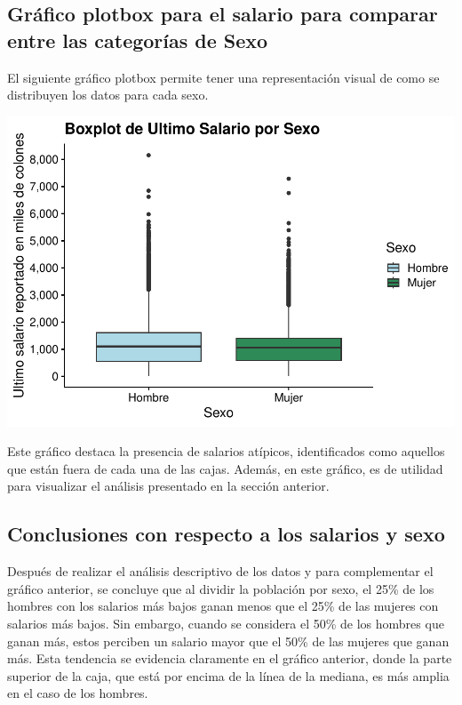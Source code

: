 \documentclass[
]{article}
\begin{document}
\newpage

\hypertarget{gruxe1fico-plotbox-para-el-salario-para-comparar-entre-las-categoruxedas-de-sexo}{%
\subsection{Gráfico plotbox para el salario para comparar entre las
categorías de
Sexo}\label{gruxe1fico-plotbox-para-el-salario-para-comparar-entre-las-categoruxedas-de-sexo}}

El siguiente gráfico plotbox permite tener una representación visual de
como se distribuyen los datos para cada sexo.

\includegraphics{mientras_files/figure-latex/unnamed-chunk-10-1.pdf}

Este gráfico destaca la presencia de salarios atípicos, identificados
como aquellos que están fuera de cada una de las cajas. Además, en este
gráfico, es de utilidad para visualizar el análisis presentado en la
sección anterior.

\hypertarget{conclusiones-con-respecto-a-los-salarios-y-sexo}{%
\subsection{Conclusiones con respecto a los salarios y
sexo}\label{conclusiones-con-respecto-a-los-salarios-y-sexo}}

Después de realizar el análisis descriptivo de los datos y para
complementar el gráfico anterior, se concluye que al dividir la
población por sexo, el 25\% de los hombres con los salarios más bajos
ganan menos que el 25\% de las mujeres con salarios más bajos. Sin
embargo, cuando se considera el 50\% de los hombres que ganan más, estos
perciben un salario mayor que el 50\% de las mujeres que ganan más. Esta
tendencia se evidencia claramente en el gráfico anterior, donde la parte
superior de la caja, que está por encima de la línea de la mediana, es
más amplia en el caso de los hombres.
\end{document}
